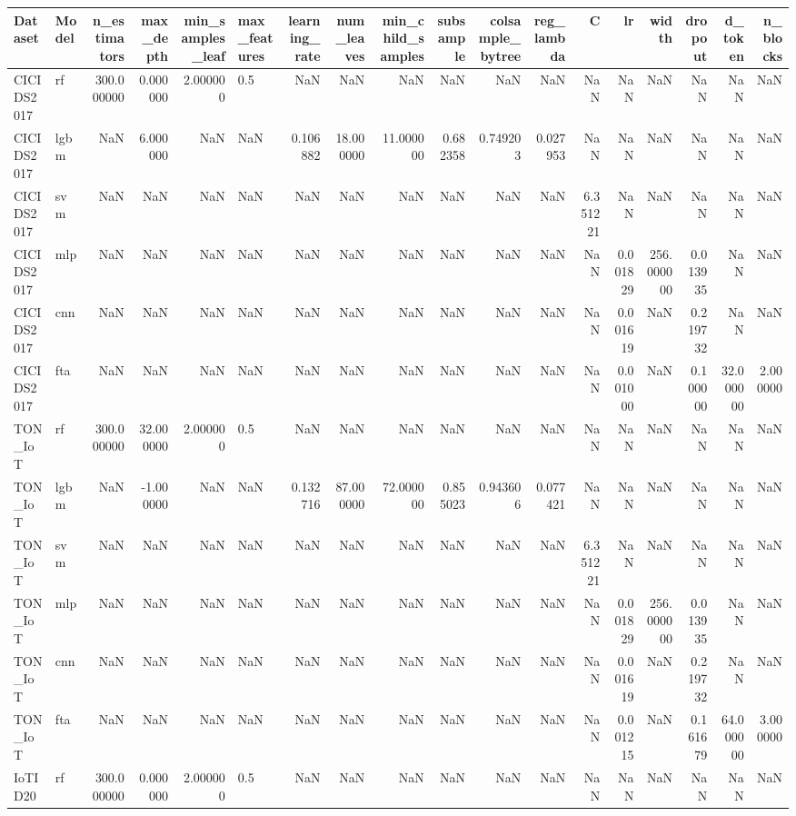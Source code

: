 \begin{tabular}{llrrrlrrrrrrrrrrrr}
\toprule
Dataset & Model & n\_estimators & max\_depth & min\_samples\_leaf & max\_features & learning\_rate & num\_leaves & min\_child\_samples & subsample & colsample\_bytree & reg\_lambda & C & lr & width & dropout & d\_token & n\_blocks \\
\midrule
CICIDS2017 & rf & 300.000000 & 0.000000 & 2.000000 & 0.5 & NaN & NaN & NaN & NaN & NaN & NaN & NaN & NaN & NaN & NaN & NaN & NaN \\
CICIDS2017 & lgbm & NaN & 6.000000 & NaN & NaN & 0.106882 & 18.000000 & 11.000000 & 0.682358 & 0.749203 & 0.027953 & NaN & NaN & NaN & NaN & NaN & NaN \\
CICIDS2017 & svm & NaN & NaN & NaN & NaN & NaN & NaN & NaN & NaN & NaN & NaN & 6.351221 & NaN & NaN & NaN & NaN & NaN \\
CICIDS2017 & mlp & NaN & NaN & NaN & NaN & NaN & NaN & NaN & NaN & NaN & NaN & NaN & 0.001829 & 256.000000 & 0.013935 & NaN & NaN \\
CICIDS2017 & cnn & NaN & NaN & NaN & NaN & NaN & NaN & NaN & NaN & NaN & NaN & NaN & 0.001619 & NaN & 0.219732 & NaN & NaN \\
CICIDS2017 & fta & NaN & NaN & NaN & NaN & NaN & NaN & NaN & NaN & NaN & NaN & NaN & 0.001000 & NaN & 0.100000 & 32.000000 & 2.000000 \\
TON\_IoT & rf & 300.000000 & 32.000000 & 2.000000 & 0.5 & NaN & NaN & NaN & NaN & NaN & NaN & NaN & NaN & NaN & NaN & NaN & NaN \\
TON\_IoT & lgbm & NaN & -1.000000 & NaN & NaN & 0.132716 & 87.000000 & 72.000000 & 0.855023 & 0.943606 & 0.077421 & NaN & NaN & NaN & NaN & NaN & NaN \\
TON\_IoT & svm & NaN & NaN & NaN & NaN & NaN & NaN & NaN & NaN & NaN & NaN & 6.351221 & NaN & NaN & NaN & NaN & NaN \\
TON\_IoT & mlp & NaN & NaN & NaN & NaN & NaN & NaN & NaN & NaN & NaN & NaN & NaN & 0.001829 & 256.000000 & 0.013935 & NaN & NaN \\
TON\_IoT & cnn & NaN & NaN & NaN & NaN & NaN & NaN & NaN & NaN & NaN & NaN & NaN & 0.001619 & NaN & 0.219732 & NaN & NaN \\
TON\_IoT & fta & NaN & NaN & NaN & NaN & NaN & NaN & NaN & NaN & NaN & NaN & NaN & 0.001215 & NaN & 0.161679 & 64.000000 & 3.000000 \\
IoTID20 & rf & 300.000000 & 0.000000 & 2.000000 & 0.5 & NaN & NaN & NaN & NaN & NaN & NaN & NaN & NaN & NaN & NaN & NaN & NaN \\

\end{tabular}

